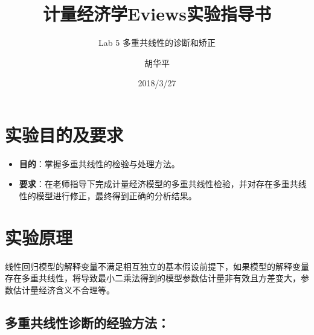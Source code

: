 \documentclass[12pt,(landscape,a4paper),(portrait,a4paper)]{article}
\title{计量经济学Eviews实验指导书}
\subtitle{Lab 5 多重共线性的诊断和矫正}
\author{胡华平}
\date{2018/3/27}
\makeatletter
\def\maxwidth{\ifdim\Gin@nat@width>\linewidth\linewidth\else\Gin@nat@width\fi}
\providecommand{\tightlist}{%
  \setlength{\itemsep}{0pt}\setlength{\parskip}{0pt}}
\let\stdsection\section
\renewcommand\section{\newpage\stdsection}
\makeatother
\begin{document}
\maketitle

\renewcommand{\figurename}{图}
\renewcommand{\contentsname}{目录}
\renewcommand{\tablename}{表}


\makeatletter
\def\maxwidth{ %
  \ifdim\Gin@nat@width>\linewidth
    \linewidth
  \else
    \Gin@nat@width
  \fi
}
\makeatother

{
\setcounter{tocdepth}{3}
\tableofcontents
}
\newpage

\section{实验目的及要求}

\begin{itemize}
\tightlist
\item
  \textbf{目的}：掌握多重共线性的检验与处理方法。
\item
  \textbf{要求}：在老师指导下完成计量经济模型的多重共线性检验，并对存在多重共线性的模型进行修正，最终得到正确的分析结果。
\end{itemize}

\section{实验原理}

线性回归模型的解释变量不满足相互独立的基本假设前提下，如果模型的解释变量存在多重共线性，将导致最小二乘法得到的模型参数估计量非有效且方差变大，参数估计量经济含义不合理等。

\subsection{多重共线性诊断的经验方法：}
\end{document}
